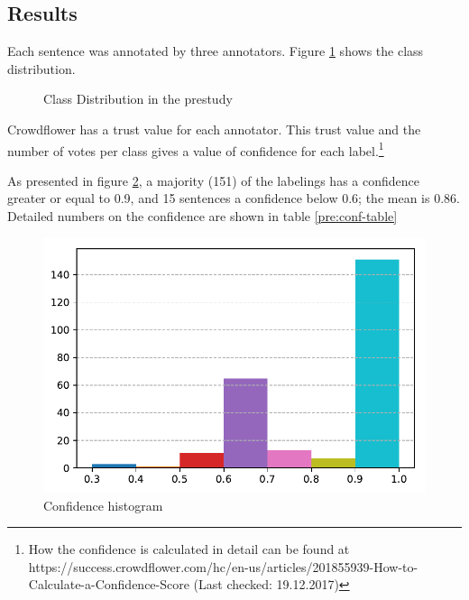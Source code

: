 \subsection{Results}
Each sentence was annotated by three annotators. Figure \ref{pre:dist} shows the class distribution.

\begin{figure}[h]
\centering
\caption{Class Distribution in the prestudy}
\label{pre:dist}
\end{figure}




Crowdflower has a trust value for each annotator. This trust value and the number of votes per class gives a value of confidence for each label.\footnote{How the confidence is calculated in detail can be found at https://success.crowdflower.com/hc/en-us/articles/201855939-How-to-Calculate-a-Confidence-Score (Last checked: 19.12.2017)}


As presented in figure \ref{pre:conf}, a majority (151) of the labelings has a confidence greater or equal to 0.9, and 15 sentences a confidence below 0.6; the mean is 0.86. Detailed numbers on the confidence are shown in table \ref{pre:conf-table}

\begin{figure}
\centering
\caption{Confidence histogram}
\label{pre:conf}
\includegraphics[scale=0.6]{images/prestudy/confidence.pdf}
\end{figure}


